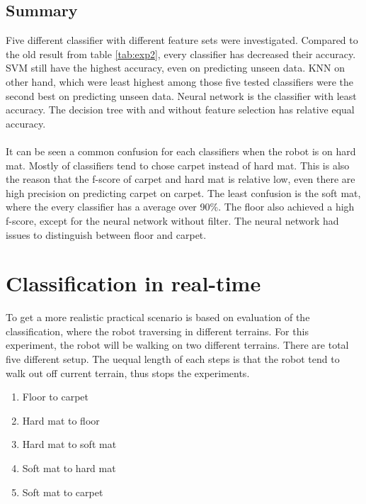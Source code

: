 \documentclass[USenglish]{ifimaster}  %
\begin{document}
\subsection{Summary}
Five different classifier with different feature sets were investigated. Compared to the old result from table \ref{tab:exp2}, every classifier has decreased their accuracy. SVM still have the highest accuracy, even on predicting unseen data. KNN on other hand, which were least highest among those five tested classifiers were the second best on predicting unseen data. Neural network is the classifier with least accuracy. The decision tree with and without feature selection has relative equal accuracy.
\\
\\
It can be seen a common confusion for each classifiers when the robot is on hard mat. Mostly of classifiers tend to chose carpet instead of hard mat. This is also the reason that the f-score of carpet and hard mat is relative low, even there are high precision on predicting carpet on carpet. The least confusion is the soft mat, where the every classifier has a average over 90\%. The floor also achieved a high f-score, except for the neural network without filter. The neural network had issues to distinguish between floor and carpet. 
	
	
	
\section{Classification in real-time} \label{sec:realtime}
To get a more realistic practical scenario  is based on evaluation of the classification, where the robot traversing in different terrains. For this experiment, the robot will be walking on two different terrains. There are total five different setup. The uequal length of each steps is that the robot tend to walk out off current terrain, thus stops the experiments. 
	
	
	\begin{enumerate}
		\item Floor to carpet
		\item Hard mat to floor
		\item Hard mat to soft mat
		\item Soft mat to hard mat
		\item Soft mat to carpet
	\end{enumerate}
	
\end{document}
